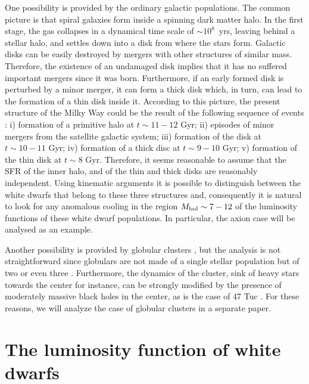 \documentclass[useAMS,usenatbib]{mnras}
\begin{document}
One possibility is provided by the ordinary galactic populations. The common picture is
that spiral galaxies form inside a spinning dark matter halo. In the first stage, the gas collapses 
in a dynamical time scale of $\sim 10^8$~yrs, leaving behind a stellar halo,
and settles down into a disk from where the stars form. Galactic disks can be easily destroyed
by mergers with other structures of similar mass. Therefore, the existence of an undamaged disk 
implies that it has no suffered important mergers since it was born. Furthermore, if an early 
formed disk is perturbed by a minor merger, it can form a thick disk which, in turn, can lead 
to the formation of a thin disk inside it. According to this picture, the present structure of 
the Milky Way could be the result of the following sequence of events \citep{reid05}: i) formation 
of a primitive halo at $t \sim 11-12$ Gyr; ii) episodes of minor mergers from the satellite galactic system; iii) formation of the disk at $t \sim 10 - 11$ Gyr; iv) formation of a thick disc at $ t \sim 9-10$ Gyr; v) formation of the thin disk at $ t \sim 8$ Gyr. Therefore, it seems reasonable to assume that the SFR of the inner halo, and of the thin and thick disks are reasonably independent.  Using kinematic  arguments  it  is  possible to  distinguish  between the white dwarfs that belong  to  these three structures  \citep{rowe11,munn17} and, consequently it is natural to look for any anomalous cooling in the  region $M_{\rm bol} \sim 7-12$ of the luminosity functions of these white dwarf populations. In particular, the axion case will be analysed as an example.

Another possibility is provided by globular clusters \citep{hans15,garc14,gold16}, but the analysis is not straightforward since globulars are not made of a single stellar population but of two or even three \citep{grat12}. Furthermore, the dynamics of the cluster, sink of heavy stars towards the center for instance, can be strongly modified by the presence of moderately massive black holes in the center, as is the case of 47 Tuc \citep{kizi17}. For these reasons, we will analyze the case of globular clusters in a separate paper. 




\section{The luminosity function of white dwarfs}
\end{document}
